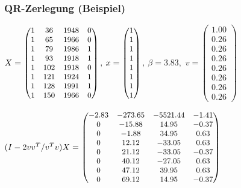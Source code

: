 \documentclass{beamer}
\begin{document}
\begin{frame}
  \frametitle{QR-Zerlegung (Beispiel)}
  $X = \small \begin{pmatrix}
    1	& 36	& 1948	& 0 \\
    1	& 65	& 1966	& 0 \\
    1	& 79	& 1986	& 1 \\
    1	& 93	& 1918	& 1 \\
    1	& 102	& 1918	& 0 \\
    1	& 121	& 1924	& 1 \\
    1	& 128	& 1991	& 1 \\
    1	& 150	& 1966	& 0 
  \end{pmatrix},$
  $x = \small \begin{pmatrix}
    1 \\ 1 \\ 1 \\ 1 \\ 1 \\ 1 \\ 1 \\ 1
  \end{pmatrix},$ 
  \pause
  $\beta = 3.83,$
  $v = \begin{pmatrix}
    1.00 \\ 0.26 \\ 0.26 \\ 0.26 \\ 0.26 \\ 0.26 \\ 0.26 \\ 0.26
  \end{pmatrix}$ \\

  \pause
  
  $(I - 2vv^T/v^Tv) X = \small \begin{pmatrix}
    -2.83 & -273.65 & -5521.44 & -1.41 \\
    0 & -15.88 & 14.95 & -0.37 \\
    0 &	-1.88 &	34.95 &	0.63 \\
    0 &	12.12 & -33.05 & 0.63 \\
    0 & 21.12 &	-33.05 & -0.37 \\
    0 &	40.12 & -27.05 & 0.63 \\
    0 &	47.12 &	39.95 & 0.63 \\
    0 & 69.12 & 14.95 & -0.37 
  \end{pmatrix}$
\end{frame}
\end{document}
